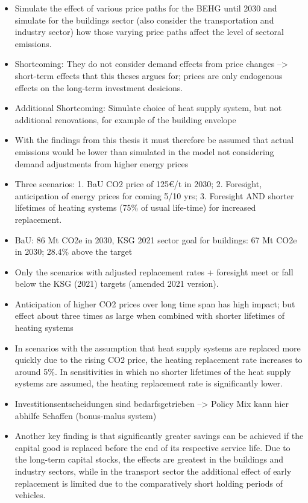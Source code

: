 \documentclass[12pt,twoside]{reedthesis}
\begin{document}
\begin{itemize}
\item
  Simulate the effect of various price paths for the BEHG until 2030 and simulate for the buildings sector (also consider the transportation and industry sector) how those varying price paths affect the level of sectoral emissions.
\item
  Shortcoming: They do not consider demand effects from price changes --\textgreater{} short-term effects that this theses argues for; prices are only endogenous effects on the long-term investment desicions.
\item
  Additional Shortcoming: Simulate choice of heat supply system, but not additional renovations, for example of the building envelope
\item
  With the findings from this thesis it must therefore be assumed that actual emissions would be lower than simulated in the model not considering demand adjustments from higher energy prices
\item
  Three scenarios: 1. BaU CO2 price of 125€/t in 2030; 2. Foresight, anticipation of energy prices for coming 5/10 yrs; 3. Foresight AND shorter lifetimes of heating systems (75\% of usual life-time) for increased replacement.
\item
  BaU: 86 Mt CO2e in 2030, KSG 2021 sector goal for buildings: 67 Mt CO2e in 2030; 28.4\% above the target
\item
  Only the scenarios with adjusted replacement rates + foresight meet or fall below the KSG (2021) targets (amended 2021 version).
\item
  Anticipation of higher CO2 prices over long time span has high impact; but effect about three times as large when combined with shorter lifetimes of heating systems
\item
  In scenarios with the assumption that heat supply systems are replaced more quickly due to the rising CO2 price, the heating replacement rate increases to around 5\%. In sensitivities in which no shorter lifetimes of the heat supply systems are assumed, the heating replacement rate is significantly lower.
\item
  Investitionsentscheidungen sind bedarfsgetrieben --\textgreater{} Policy Mix kann hier abhilfe Schaffen (bonus-malus system)
\item
  Another key finding is that significantly greater savings can be achieved if the capital good is replaced before the end of its respective service life. Due to the long-term capital stocks, the effects are greatest in the buildings and industry sectors, while in the transport sector the additional effect of early replacement is limited due to the comparatively short holding periods of vehicles.

\end{itemize}
\end{document}
